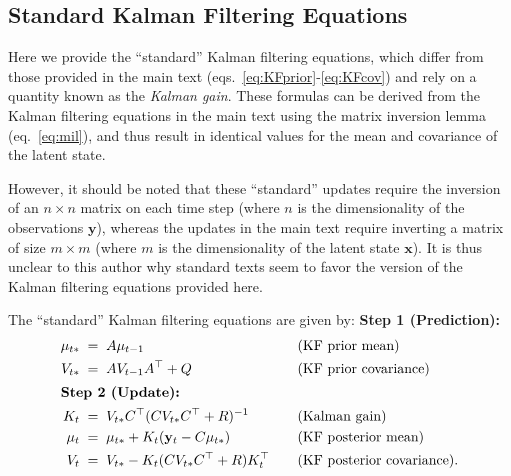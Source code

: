 \documentclass[10pt]{article}
\newcommand{\vx}{\mathbf{x}}
\newcommand{\vy}{\mathbf{y}}
\begin{document}


\begin{appendices}

\section{Standard Kalman Filtering Equations}
 
Here we provide the ``standard'' Kalman filtering equations, which
differ from those provided in the main text
(eqs.~\ref{eq:KFprior}-\ref{eq:KFcov}) and rely on a quantity known as
the {\it Kalman gain}. These formulas can be derived from the Kalman
filtering equations in the main text using the matrix inversion lemma
(eq.~\ref{eq:mil}), and thus result in identical values for the mean
and covariance of the latent state.

However, it should be noted that these ``standard'' updates require
the inversion of an $n\times n$ matrix on each time step (where $n$ is
the dimensionality of the observations $\vy$), whereas the updates in
the main text require inverting a matrix of size $m \times m$ (where
$m$ is the dimensionality of the latent state $\vx$).  It is thus
unclear to this author why standard texts seem to favor the version of
the Kalman filtering equations provided here.


The ``standard'' Kalman filtering equations are given by:
{\bf Step 1 (Prediction):}
\begin{alignat}{2}
\mu_{t*} &\;=\; A\mu_{t-1}    & &   \textrm{(KF prior mean)}  \label{eq:priormean}\\ 
V_{t*} &\;=\; AV_{t-1}A\trp + Q    & &   \textrm{(KF prior
  covariance)}  \label{eq:priorcov}\\
\intertext{\bf Step 2 (Update):}
K_t &\;=\; V_{t*}C\trp (CV_{t*}C\trp + R)\inv   & &    \textrm{(Kalman gain)}  \label{eq:kfgain}\\
\mu_t &\;=\;  \mu_{t*} + K_t (\vy_t - C\mu_{t*}) \qquad & &
\textrm{(KF posterior mean)} \label{eq:meanupdate}\\
V_t &\;=\; V_{t*} - K_t (CV_{t*}C\trp + R) K_t\trp  \quad & &
\textrm{(KF posterior
  covariance)}. \label{eq:covupdate}
 \end{alignat}




\end{appendices}
\end{document}
